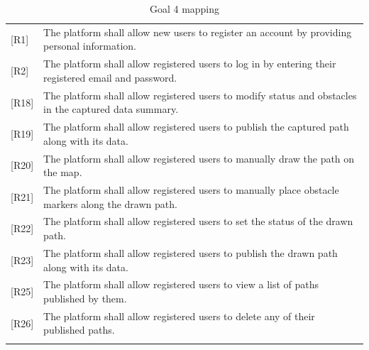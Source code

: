 \begin{table}[H]
\begin{tabularx}{\textwidth}{|l X|}
        {[R1]} & The platform shall allow new users to register an account by providing personal information. \\
        {[R2]} & The platform shall allow registered users to log in by entering their registered email and password. \\
        {[R18]} & The platform shall allow registered users to modify status and obstacles in the captured data
        summary. \\
        {[R19]} & The platform shall allow registered users to publish the captured path along with its data. \\
        {[R20]} & The platform shall allow registered users to manually draw the path on the map. \\
        {[R21]} & The platform shall allow registered users to manually place obstacle markers along the drawn path. \\
        {[R22]} & The platform shall allow registered users to set the status of the drawn path. \\
        {[R23]} & The platform shall allow registered users to publish the drawn path along with its data. \\
        {[R25]} & The platform shall allow registered users to view a list of paths published by them. \\
        {[R26]} & The platform shall allow registered users to delete any of their published paths. \\
        & \\
        \hline
    \end{tabularx}
    \caption{Goal 4 mapping}
\end{table}


